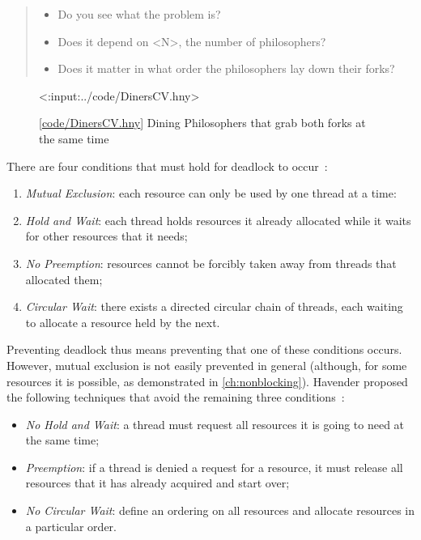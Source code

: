 \documentclass{report}
\newcommand{\harmonylink}[1]{%
[\href{https://harmony.cs.cornell.edu/#1}{\underline{#1}}]%
}
\newenvironment{code}{
\tcolorbox
}{
\endtcolorbox
}
\begin{document}
\begin{quote}
\begin{itemize}
\item Do you see what the problem is?
\item Does it depend on <{N}>, the number of philosophers?
\item Does it matter in what order the philosophers lay down their forks?
\end{itemize}
\end{quote}


\begin{figure}
\begin{code}
<{:input:../code/DinersCV.hny}>
\end{code}
\caption{\harmonylink{code/DinersCV.hny} Dining Philosophers that grab both forks at the same time}
\label{fig:dinerscv}
\end{figure}

\noindent
There are four conditions that must hold for deadlock to occur~\cite{CES71}:
\begin{enumerate}
\item \emph{Mutual Exclusion}: each resource can only be used by one thread at a time:
\item \emph{Hold and Wait}: each thread holds resources it already allocated while it
waits for other resources that it needs;
\item \emph{No Preemption}: resources cannot be forcibly taken away from threads that
allocated them;
\item \emph{Circular Wait}: there exists a directed circular chain of threads, each waiting
to allocate a resource held by the next.
\end{enumerate}

Preventing deadlock thus means preventing that one of these conditions occurs.
However, mutual exclusion is not easily prevented in general
(although, for some resources it is
possible, as demonstrated in \autoref{ch:nonblocking}).
Havender proposed the following techniques that avoid the remaining
three conditions~\cite{Havender68}:

\begin{itemize}
\item \emph{No Hold and Wait}: a thread must request all resources it is going to
need at the same time;
\item \emph{Preemption}: if a thread is denied a request for a resource, it must
release all resources that it has already acquired and start over;
\item \emph{No Circular Wait}: define an ordering on all resources and allocate
resources in a particular order.
\end{itemize}
\end{document}
